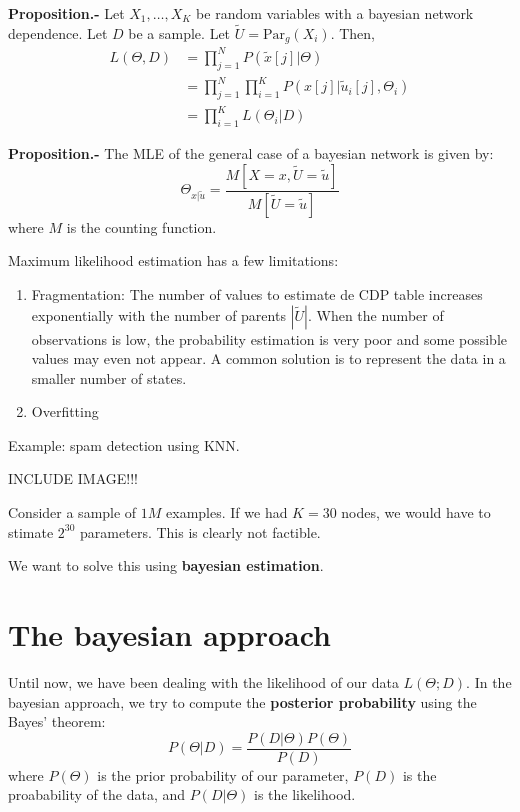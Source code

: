 \textbf{Proposition.-} Let \(X_1, \dots, X_K\) be random variables with
a bayesian network dependence. Let \(D\) be a sample. Let
\(\tilde U = \text{Par}_g(X_i)\). Then, \begin{align*}
L(\Theta,D) & = \prod_{j=1}^N P(\tilde x[j]|\Theta)\\
& = \prod_{j=1}^N \prod_{i=1}^{K} P(x[j]| \tilde u_i[j],\Theta_i)\\
& = \prod_{i=1}^{K} L(\Theta_i| D)
\end{align*}

\textbf{Proposition.-} The MLE of the general case of a bayesian network
is given by: \[
\Theta_{x|\tilde u} = \frac{M[X = x, \tilde U = \tilde u]}{M[\tilde U = \tilde u]}
\] where \(M\) is the counting function.


Maximum likelihood estimation has a few limitations:

\begin{enumerate}
  \item Fragmentation: The number of values to estimate de CDP table increases exponentially with the number of parents \(|\tilde U|\). When the number of observations is low, the probability estimation is very poor and some possible values may even not appear. A common solution is to represent the data in a smaller number of states.
        \item Overfitting
\end{enumerate}


Example: spam detection using KNN.

INCLUDE IMAGE!!!

Consider a sample of \(1M\) examples. If we had \(K = 30\) nodes, we would have to stimate \(2^{30}\) parameters. This is clearly not factible.



We want to solve this using \textbf{bayesian estimation}.

\section{The bayesian approach}

Until now, we have been dealing with the likelihood of our data \(L(\Theta ;D)\). In the bayesian approach, we try to compute the \textbf{posterior probability} using the Bayes' theorem:
\[
  P(\Theta|D) = \frac{P(D|\Theta)P(\Theta)}{P(D)}
\]
where \(P(\Theta)\) is the prior probability of our parameter, \(P(D)\) is the proabability of the data, and \(P(D|\Theta)\) is the likelihood.\\

